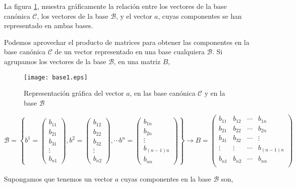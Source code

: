 \begin{paracol}{2}
La figura \ref{fig:base1}, muestra gráficamente la relación entre los vectores de la base canónica $\mathcal{C}$, los vectores de la base $\mathcal{B}$, y el vector $a$, cuyas componentes se han representado en ambas bases.

Podemos aprovechar el producto de matrices para obtener las componentes en la base canónica $\mathcal{C}$ de un vector representado en una base cualquiera $\mathcal{B}$. Si agrupamos los vectores de la base $\mathcal{B}$, en una matriz $B$,
\end{paracol}
\begin{figure}[h]
\centering
\texttt{[image: base1.eps]}
\caption{Representación gráfica del vector $a$, en las base canónica $\mathcal{C}$ y en la base $\mathcal{B}$}
\label{fig:base1}
\end{figure}

\begin{equation*}
\mathcal{B}=\left\lbrace b^1=\begin{pmatrix}
b_{11}\\
b_{21}\\
b_{31}\\
\vdots \\
b_{n1}
\end{pmatrix},b^2=\begin{pmatrix}
b_{12}\\
b_{22}\\
b_{32}\\
\vdots \\
b_{n2}
\end{pmatrix},
\cdots
b^n=\begin{pmatrix}
b_{1n}\\
b_{2n}\\
\vdots \\
b_{(n-1)n}\\
b_{nn}
\end{pmatrix} \right\rbrace \rightarrow
B=\begin{pmatrix}
b_{11}&b_{12}& \cdots & b_{1n}\\
b_{21}&b_{22}& \cdots & b_{2n}\\
b_{31}&b_{32}& \cdots & \vdots \\
\vdots & \vdots & \cdots &  b_{(n-1)n}\\
b_{n1}&b_{n2}& \cdots & b_{nn}\\
\end{pmatrix}
\end{equation*}
\begin{paracol}{2}
Supongamos que tenemos un vector $a$ cuyas componentes en la base $\mathcal{B}$ son,
\end{paracol}

